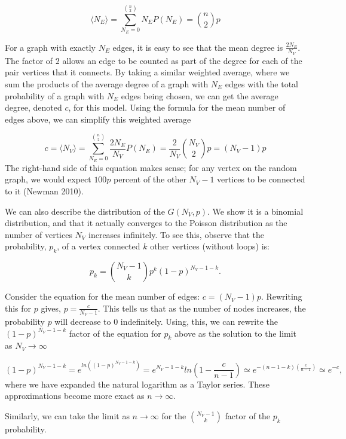 \documentclass[12pt,twoside]{amherstthesis}
\begin{document}
  \[ \langle N_{E} \rangle = \sum_{N_{E}=0}^{{n \choose 2}} N_{E}P(N_{E}) = {n \choose 2}p\]
  
  For a graph with exactly \(N_{E}\) edges, it is easy to see that the
  mean degree is \(\frac {2N_{E}} {N_{V}}\). The factor of \(2\) allows an
  edge to be counted as part of the degree for each of the pair vertices
  that it connects. By taking a similar weighted average, where we sum the
  products of the average degree of a graph with \(N_E\) edges with the
  total probability of a graph with \(N_E\) edges being chosen, we can get
  the average degree, denoted \(c\), for this model. Using the formula for
  the mean number of edges above, we can simplify this weighted average
  
  \[c = \langle N_{V} \rangle = \sum_{N_{E}=0}^{{n \choose 2}} \frac {2N_{E}} {N_{V}} P(N_{E}) = \frac {2} {N_{V}} {N_{V} \choose 2}p = (N_{V} - 1)p\]
  The right-hand side of this equation makes sense; for any vertex on the
  random graph, we would expect \(100p\) percent of the other
  \(N_{V} - 1\) vertices to be connected to it (Newman 2010).
  
  We can also describe the distribution of the \(G(N_V, p)\). We show it
  is a binomial distribution, and that it actually converges to the
  Poisson distribution as the number of vertices \(N_{V}\) increases
  infinitely. To see this, observe that the probability, \(p_k\), of a
  vertex connected \(k\) other vertices (without loops) is:
  
  \[p_{k} = {N_{V} -1 \choose k}p^{k}(1 - p)^{N_{V} - 1 - k}.\]
  
  Consider the equation for the mean number of edges:
  \(c = (N_{V} - 1)p\). Rewriting this for \(p\) gives,
  \(p = \frac {c} {N_{V} - 1}\). This tells us that as the number of nodes
  increases, the probability \(p\) will decrease to \(0\) indefinitely.
  Using, this, we can rewrite the \((1 - p)^{N_{V} - 1 - k}\) factor of
  the equation for \(p_{k}\) above as the solution to the limit as
  \(N_{V} \to \infty\)
  
  \[(1 - p)^{N_{V} - 1 - k} = e^{ln((1 - p)^{N_{V} - 1 - k})} = e^{N_{V} - 1 - k}ln(1 - \frac {c} {n - 1}) \simeq e^{-(n - 1 - k)(\frac {c} {n - 1})} \simeq e^{-c},\]
  where we have expanded the natural logarithm as a Taylor series. These
  approximations become more exact as \(n \to \infty\).
  
  Similarly, we can take the limit as \(n \to \infty\) for the
  \({N_{V} - 1 \choose k}\) factor of the \(p_k\) probability.
  
\end{document}
